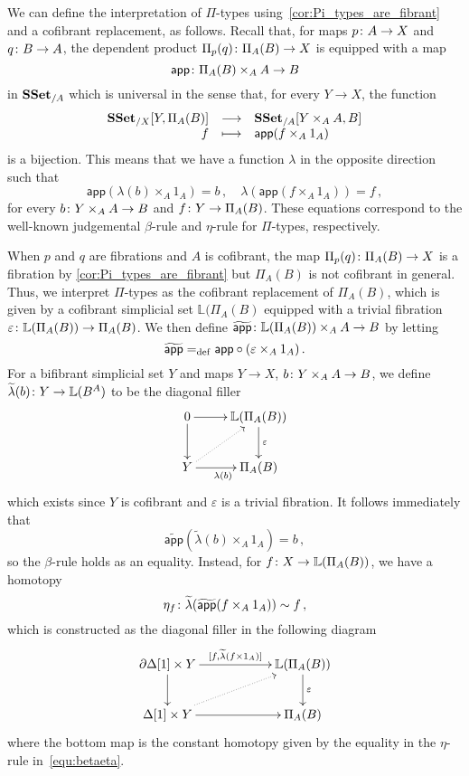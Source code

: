 \documentclass[reqno,10pt,a4paper,oneside,draft]{amsart}
\begin{document}
\begin{remark}[$\Pi$-types] \label{rem:pi-types}
We can define the interpretation of $\Pi$-types using~\cref{cor:Pi_types_are_fibrant} and a cofibrant replacement, as follows. 
Recall that, for maps $p \colon A \to X$ and $q \colon B \to A$,  the dependent product $\Pi_p(q) \colon \Pi_A(B)
\to X$ is equipped with a map
\[
\mathsf{app} \colon \Pi_A(B) \times_A  A \to B
\] 
in $\mathbf{SSet}_{/A}$ which is universal in the sense that, for every  $Y \to X$, the function
\[
\begin{array}{rcl} 
 \mathbf{SSet}_{/X}[ Y , \Pi_A(B)] & \longrightarrow &  \mathbf{SSet}_{/A}[Y \times_A A, B]  \\
  f & \longmapsto & \mathsf{app}(f \times_A 1_A) 
  \end{array} 
 \]
 is a bijection. This means that we have a function $\lambda$ in the opposite direction such that  
 \begin{equation}
 \label{equ:betaeta}
 \mathsf{app}(\lambda(b) \times_A 1_A) = b   \, , \quad
 \lambda( \mathsf{app}(f \times_A 1_A)) = f \, ,
 \end{equation}
 for every $b \colon Y \times_A A \to B$ and $f \colon Y \to \Pi_A(B)$.  These equations correspond to the
 well-known judgemental $\beta$-rule and $\eta$-rule for $\Pi$-types, respectively.
 
 When $p$ and $q$ are fibrations and $A$ is cofibrant, the map 
 $\Pi_p(q) \colon \Pi_A(B) \to X$ is a fibration by \cref{cor:Pi_types_are_fibrant} but $\Pi_A(B)$ is not cofibrant
 in general. Thus, we interpret  $\Pi$-types as the 
 cofibrant replacement  of $\Pi_A(B)$, which is given by a cofibrant simplicial set
 $\mathbb{L}(\Pi_A(B)$  equipped with
 a trivial fibration $\varepsilon \colon \mathbb{L}(\Pi_A(B)) \to \Pi_A(B)$. 
We then define $\widetilde{\mathsf{app}} \colon   \mathbb{L}(\Pi_A(B)) \times_A A \to B$ by letting
\[
\widetilde{\mathsf{app}}  =_{\operatorname{def}} \mathsf{app} \circ (\varepsilon \times_A 1_A) \, .
\]
For a bifibrant simplicial set $Y$ and maps $Y \to X$,  $b \colon Y \times_A A \to B$, we define $\widetilde{\lambda}(b) \colon Y \to \mathbb{L}(B^A)$ to be the
diagonal filler
\[
\xymatrix{
0 \ar[r] \ar[d] & \mathbb{L}(\Pi_A(B))  \ar[d]^\varepsilon \\
Y \ar[r]_{\lambda(b)} \ar@{.>}[ur] & \Pi_A(B)}
\]
which exists since $Y$ is cofibrant and $\varepsilon$ is a trivial fibration. It follows immediately that
\[
 \widetilde{\mathsf{app}}(\widetilde{\lambda}(b) \times_A 1_A) = b \, ,
\]
so the $\beta$-rule holds as an equality. Instead, for $f \colon X \to \mathbb{L}(\Pi_A(B))$, we have a homotopy
\[
\eta_f  \colon \widetilde{\lambda}( \widetilde{\mathsf{app}}(f \times_A 1_A)) \sim  f  \, ,
\]
which is constructed as the diagonal filler in the following diagram
\[
\xymatrix@C=2cm{
\partial \Delta[1] \times Y \ar[r]^-{[f, \widetilde{\lambda}(f \times 1_A)]} \ar[d] & \mathbb{L}(\Pi_A(B)) \ar[d]^\varepsilon \\
\Delta[1] \times Y \ar[r] \ar@{.>}[ur] & \Pi_A(B) }
\]
where the bottom map is the constant homotopy given by the equality in the $\eta$-rule in~\eqref{equ:betaeta}.
\end{remark}
\end{document}
